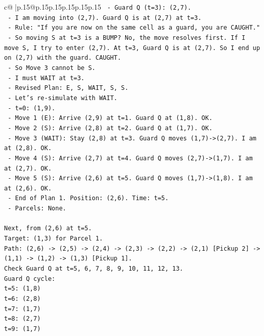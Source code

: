 \documentclass{article}
\begin{document}
{\begin{supertabular}{c@{$\;$}|p{.15\linewidth}@{}p{.15\linewidth}p{.15\linewidth}p{.15\linewidth}p{.15\linewidth}p{.15\linewidth}}
{{{\texttt{  {-} Guard Q (t=3): (2,7).} \\
\texttt{  {-} I am moving into (2,7). Guard Q is at (2,7) at t=3.} \\
\texttt{  {-} Rule: "If you are now on the same cell as a guard, you are CAUGHT."} \\
\texttt{  {-} So moving S at t=3 is a BUMP? No, the move resolves first. If I move S, I try to enter (2,7). At t=3, Guard Q is at (2,7). So I end up on (2,7) with the guard. CAUGHT.} \\
\texttt{  {-} So Move 3 cannot be S.} \\
\texttt{  {-} I must WAIT at t=3.} \\
\texttt{  {-} Revised Plan: E, S, WAIT, S, S.} \\
\texttt{  {-} Let's re{-}simulate with WAIT.} \\
\texttt{  {-} t=0: (1,9).} \\
\texttt{  {-} Move 1 (E): Arrive (2,9) at t=1. Guard Q at (1,8). OK.} \\
\texttt{  {-} Move 2 (S): Arrive (2,8) at t=2. Guard Q at (1,7). OK.} \\
\texttt{  {-} Move 3 (WAIT): Stay (2,8) at t=3. Guard Q moves (1,7){-}>(2,7). I am at (2,8). OK.} \\
\texttt{  {-} Move 4 (S): Arrive (2,7) at t=4. Guard Q moves (2,7){-}>(1,7). I am at (2,7). OK.} \\
\texttt{  {-} Move 5 (S): Arrive (2,6) at t=5. Guard Q moves (1,7){-}>(1,8). I am at (2,6). OK.} \\
\texttt{  {-} End of Plan 1. Position: (2,6). Time: t=5.} \\
\texttt{  {-} Parcels: None.} \\
\\ 
\texttt{Next, from (2,6) at t=5.} \\
\texttt{Target: (1,3) for Parcel 1.} \\
\texttt{Path: (2,6) {-}> (2,5) {-}> (2,4) {-}> (2,3) {-}> (2,2) {-}> (2,1) {[}Pickup 2{]} {-}> (1,1) {-}> (1,2) {-}> (1,3) {[}Pickup 1{]}.} \\
\texttt{Check Guard Q at t=5, 6, 7, 8, 9, 10, 11, 12, 13.} \\
\texttt{Guard Q cycle:} \\
\texttt{t=5: (1,8)} \\
\texttt{t=6: (2,8)} \\
\texttt{t=7: (1,7)} \\
\texttt{t=8: (2,7)} \\
\texttt{t=9: (1,7)} \\
}}}
\end{supertabular}}
\end{document}
